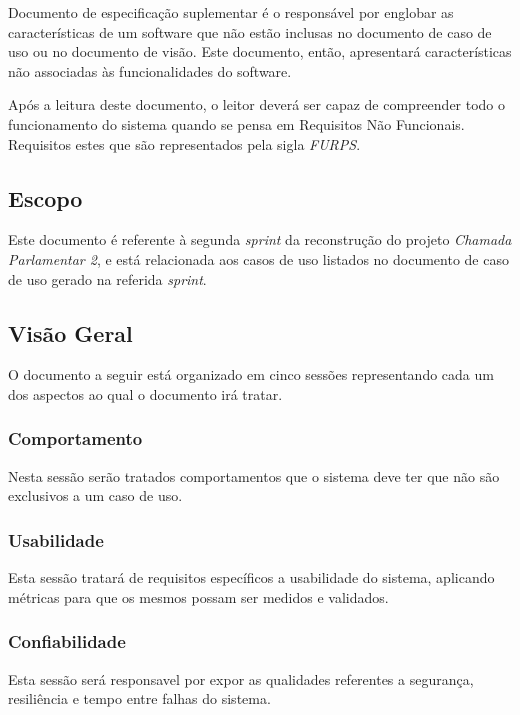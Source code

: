 
Documento de especificação suplementar é o responsável por englobar as características de um software que não estão inclusas no documento de caso de uso ou no documento de visão. Este documento, então, apresentará características não associadas às funcionalidades do software. 

Após a leitura deste documento, o leitor deverá ser capaz de compreender todo o funcionamento do sistema quando se pensa em Requisitos Não Funcionais. Requisitos estes que são representados pela sigla \textit{FURPS}.

\subsection{Escopo}

Este documento é referente à segunda \textit{sprint} da reconstrução do projeto \textit{Chamada Parlamentar 2}, e está relacionada aos casos de uso listados no documento de caso de uso gerado na referida \textit{sprint}.

\subsection{Visão Geral}

O documento a seguir está organizado em cinco sessões representando cada um dos aspectos ao qual o documento irá tratar.

\subsubsection{Comportamento}

Nesta sessão serão tratados comportamentos que o sistema deve ter que não são exclusivos a um caso de uso.

\subsubsection{Usabilidade}

Esta sessão tratará de requisitos específicos a usabilidade do sistema, aplicando métricas para que os mesmos possam ser medidos e validados.

\subsubsection{Confiabilidade}

Esta sessão será responsavel por expor as qualidades referentes a segurança, resiliência e tempo entre falhas do sistema.

